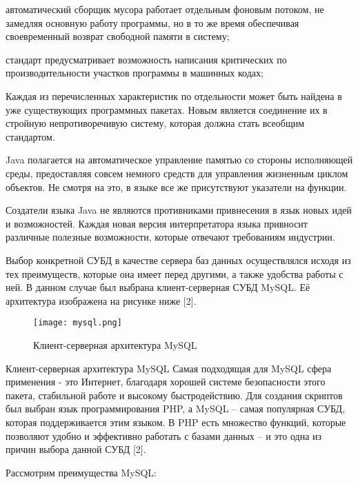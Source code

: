 автоматический сборщик мусора работает отдельным фоновым потоком, не замедляя основную работу программы, но в то же время обеспечивая своевременный возврат свободной памяти в систему;

стандарт предусматривает возможность написания критических по производительности участков программы в машинных кодах;

Каждая из перечисленных характеристик по отдельности может быть найдена в уже существующих программных пакетах. Новым является соединение их в стройную непротиворечивую систему, которая должна стать всеобщим стандартом.

Java полагается на автоматическое управление памятью со стороны исполняющей среды, предоставляя совсем немного средств для управления жизненным циклом объектов.
Не смотря на это, в языке все же присутствуют указатели на функции.

Создатели языка Java не являются противниками привнесения в язык новых идей и возможностей.
Каждая новая версия интерпретатора языка привносит различные полезные возможности, которые отвечают требованиям индустрии.

Выбор конкретной СУБД в качестве сервера баз данных осуществлялся исходя из тех преимуществ, которые она имеет перед другими, а также удобства работы с ней. В данном случае был выбрана клиент-серверная СУБД MySQL. Её архитектура изображена на рисунке ниже [2]. 

\begin{figure}[!htb]
	\centering
	\texttt{[image: mysql.png]}
	\caption{ Клиент-серверная архитектура MySQL}
	\label{fig:arch_and_mod::lexer_flow}
	\clearpage
\end{figure}

Клиент-серверная архитектура MySQL
Самая подходящая для MySQL сфера применения - это Интернет, благодаря хорошей системе безопасности этого пакета, стабильной работе и высокому быстродействию. Для создания скриптов был выбран язык программирования PHP, а MySQL – самая популярная СУБД, которая поддерживается этим языком. В PHP есть множество функций, которые позволяют удобно и эффективно работать с базами данных – и это одна из причин выбора данной СУБД [2].

Рассмотрим преимущества MySQL:

